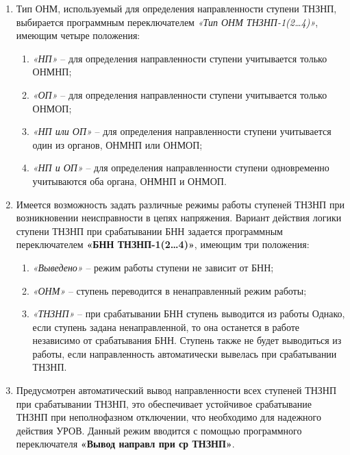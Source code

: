\begin{enumerate}[label=\arabic{section}.\arabic{subsection}.\arabic*,  align=left, labelsep=4pt, leftmargin=0pt, itemindent=57pt]
\item
Тип ОНМ, используемый для определения направленности ступени ТНЗНП, выбирается программным
переключателем \textit{«Тип ОНМ ТНЗНП-1(2…4)»}, имеющим четыре положения:
\begin{enumerate}[label=\arabic*)]
    \item \textit{«НП»} -- для определения направленности ступени учитывается только ОНМНП;
    \item \textit{«ОП»} -- для определения направленности ступени учитывается только ОНМОП;
    \item \textit{«НП или ОП»} -- для определения направленности ступени учитывается один из органов, ОНМНП или ОНМОП;
    \item \textit{«НП и ОП»} -- для определения направленности ступени одновременно учитываются оба органа, ОНМНП и ОНМОП.
\end{enumerate}

\item
Имеется возможность задать различные режимы работы ступеней ТНЗНП при возникновении
неисправности в цепях напряжения. Вариант действия логики ступени ТНЗНП при
срабатывании БНН задается программным переключателем \textbf{«БНН ТНЗНП-1(2…4)»}, имеющим три положения:
\begin{enumerate}[label=\arabic*)]
\item \textit{«Выведено»} -- режим работы ступени не зависит от БНН;
\item \textit{«ОНМ»} -- ступень переводится в ненаправленный режим работы;
\item \textit{«ТНЗНП»} --  при срабатывании БНН ступень выводится из работы Однако, если ступень задана ненаправленной, то она останется в работе независимо от срабатывания БНН. Ступень также не будет выводиться из работы, если направленность автоматически вывелась при срабатывании ТНЗНП.
\end{enumerate}

\item
Предусмотрен автоматический вывод направленности всех ступеней ТНЗНП при срабатывании ТНЗНП,
это обеспечивает устойчивое срабатывание ТНЗНП при неполнофазном отключении, что необходимо для
надежного действия УРОВ. Данный режим вводится с помощью программного переключателя \textbf{«Вывод
направл при ср ТНЗНП»}.


\end{enumerate}
